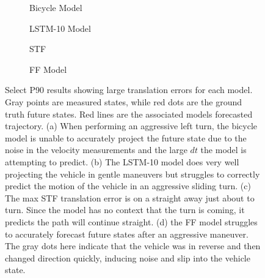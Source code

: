 \documentclass[letterpaper, 10 pt, conference]{ieeeconf}  %
\newcommand{\aar}[1]{{\color{red}AAR:#1} }
\begin{document}
\begin{figure}
\vspace{4pt}
     \centering
     \begin{subfigure}[b]{0.23\textwidth}
         \centering
         \scalebox{1.0}{}
         \caption{Bicycle Model \cite{bikemodel}}
         \label{fig:y equals x}
     \end{subfigure}
     \hfill
     \begin{subfigure}[b]{0.24\textwidth}
         \centering
         \scalebox{1.0}{}
         \caption{LSTM-10 Model}
         \label{fig:three sin x}
     \end{subfigure}
     \hfill
     \begin{subfigure}[b]{0.23\textwidth}
         \centering
         \scalebox{1.0}{}
         \caption{STF }
         \label{fig:stf_worst_err}
     \end{subfigure}
     \hfill
     \begin{subfigure}[b]{0.24\textwidth}
         \centering
         \scalebox{1.0}{}
         \caption{FF Model \cite{goldfain2019autorally}}
         \label{fig:five over x}
     \end{subfigure}
        \caption{Select P90 results showing large translation errors for each model. Gray points are measured states, while red dots are the ground truth future states. Red lines are the associated models forecasted trajectory. (a) When performing an aggressive left turn, the bicycle model is unable to accurately project the future state due to the noise in the velocity measurements and the large $dt$ the model is attempting to predict. (b) The LSTM-10 model does very well projecting the vehicle in gentle maneuvers but struggles to correctly predict the motion of the vehicle in an aggressive sliding turn. (c) The max STF translation error is on a straight away just about to turn. Since the model has no context that the turn is coming, it predicts the path will continue straight. (d) the FF model struggles to accurately forecast future states after an aggressive maneuver. The gray dots here indicate that the vehicle was in reverse and then changed direction quickly, inducing noise and slip into the vehicle state.}
        \label{fig:worst_errors}
\end{figure}
\end{document}

